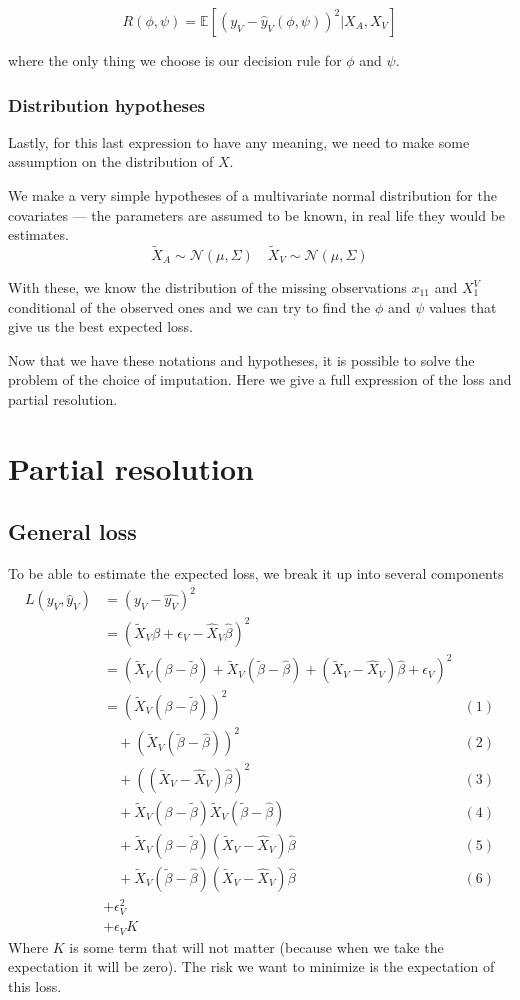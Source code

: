 \documentclass[12pt, a4paper]{memoir}
\begin{document}
$$R(\phi, \psi) = \mathbb{E}[(y_V - \hat{y}_V(\phi,\psi))^2 \vert X_A, X_V]$$

where the only thing we choose is our decision rule for $\phi$ and $\psi$.
			\subsubsection{Distribution hypotheses}
Lastly, for this last expression to have any meaning, we need to make some assumption on the distribution of $X$.

We make a very simple hypotheses of a multivariate normal distribution for the covariates --- the parameters are assumed to be known, in real life they would be estimates.
$$
\tilde{X}_A \sim \mathcal{N}(\mu, \Sigma) \quad \tilde{X}_V \sim \mathcal{N}(\mu, \Sigma)
$$

With these, we know the distribution of the missing observations $x_{11}$ and $X_1^V$ conditional of the observed ones and we can try to find the $\phi$ and $\psi$ values that give us the best expected loss.

Now that we have these notations and hypotheses, it is possible to solve the problem of the choice of imputation. Here we give a full expression of the loss and partial resolution.

	\section{Partial resolution}
		\subsection{General loss}
To be able to estimate the expected loss, we break it up into several components
\begin{align*}
L(y_V, \hat{y}_V) &= (y_V - \hat{y_V})^2 &\\
				   &= (\tilde{X}_V \beta + \epsilon_V - \hat{X}_V \hat{\beta})^2 &\\
				   &= (\tilde{X}_V(\beta - \tilde{\beta}) + \tilde{X}_V (\tilde{\beta} - \hat{\beta}) + (\tilde{X}_V - \hat{X}_V) \hat{\beta} + \epsilon_V)^2 & \\
				   &= (\tilde{X}_V (\beta - \tilde{\beta}))^2 & (1) \\
				   & \quad + (\tilde{X}_V (\tilde{\beta}-\hat{\beta}))^2 &(2) \\
				   & \quad + ((\tilde{X}_V - \hat{X}_V) \hat{\beta})^2 &(3) \\
				   & \quad + \tilde{X}_V (\beta - \tilde{\beta}) \tilde{X}_V (\tilde{\beta} - \hat{\beta}) & (4) \\
				   & \quad + \tilde{X}_V (\beta - \tilde{\beta}) (\tilde{X}_V - \hat{X}_V )\hat{\beta} & (5) \\
				   & \quad + \tilde{X}_V (\tilde{\beta} - \hat{\beta}) (\tilde{X}_V - \hat{X}_V) \hat{\beta} & (6)\\
				   & + \epsilon_V^2 &\\
				   & + \epsilon_V K
\end{align*}
Where $K$ is some term that will not matter (because when we take the expectation it will be zero). The risk we want to minimize is the expectation of this loss.
\end{document}
